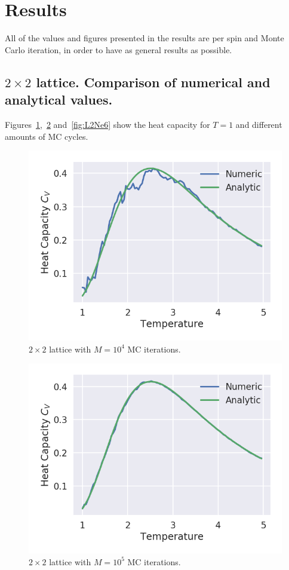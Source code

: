 \documentclass[aps,reprint]{revtex4-1}
\begin{document}
\section{Results} \label{sec:results}
All of the values and figures presented in the results are per spin and Monte Carlo
iteration, in order to have as general results as possible.
\subsection{$2 \times 2$ lattice. Comparison of numerical and analytical values.}
Figures~\ref{fig:L2Ne4},~\ref{fig:L2Ne5} and~\ref{fig:L2Ne6} show
the heat capacity for $T = 1$ and different amounts of MC cycles.
\begin{figure}
  \centering
  \includegraphics[width=\columnwidth]{figures/L2Ne4.png}
  \caption{$2 \times 2$ lattice with $M = 10^4$ MC iterations.}
  \label{fig:L2Ne4}
\end{figure}
\begin{figure}
  \centering
  \includegraphics[width=\columnwidth]{figures/L2Ne5.png}
  \caption{$2 \times 2$ lattice with $M = 10^5$ MC iterations.}
  \label{fig:L2Ne5}
\end{figure}
\end{document}
